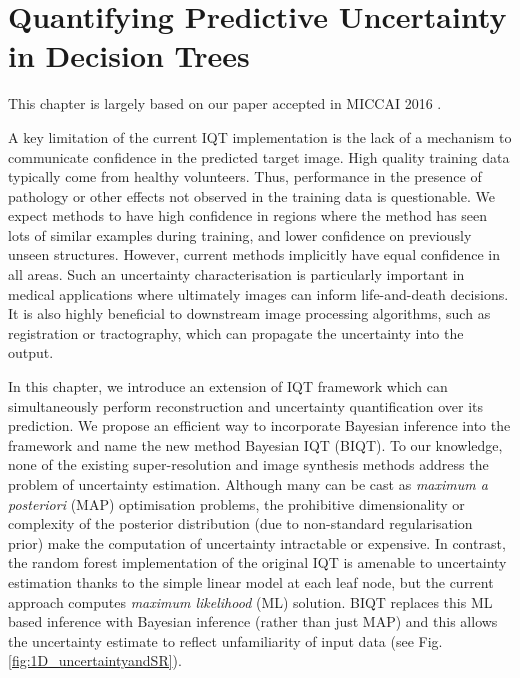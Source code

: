 \chapter{Quantifying Predictive Uncertainty in Decision Trees}
\label{chapter:biqt}
This chapter is largely based on our paper accepted in MICCAI 2016 \cite{tanno2016bayesian}.

A key limitation of the current IQT implementation is the lack of a mechanism to communicate confidence in the predicted target image. High quality training data typically come from healthy volunteers. Thus, performance in the presence of pathology or other effects not observed in the training data is questionable. We expect methods to have high confidence in regions where the method has seen lots of similar examples during training, and lower confidence on previously unseen structures. However, current methods implicitly have equal confidence in all areas. Such an uncertainty characterisation is particularly important in medical applications where ultimately images can inform life-and-death decisions. It is also highly beneficial to downstream image processing algorithms, such as registration or tractography, which can propagate the uncertainty into the output.

In this chapter, we introduce an extension of IQT framework which can simultaneously perform reconstruction and uncertainty quantification over its prediction. We propose an efficient way to incorporate Bayesian inference into the framework and name the new method Bayesian IQT (BIQT). To our knowledge, none of the existing super-resolution \cite{rousseau2008brain,coupe2013collaborative,rueda2013single,wang2014sparse} and image synthesis methods \cite{ye2013modality,jog2015mr,burgos2015robust,wein2008automatic} address the problem of uncertainty estimation. Although many can be cast as \textit{maximum a posteriori} (MAP) optimisation problems, the prohibitive dimensionality or complexity of the posterior distribution (due to non-standard regularisation prior) make the computation of uncertainty intractable or expensive. In contrast, the random forest implementation of the original IQT is amenable to uncertainty estimation thanks to the simple linear model at each leaf node, but the current approach computes \textit{maximum likelihood} (ML) solution. BIQT replaces this ML based inference with Bayesian inference (rather than just MAP) and this allows the uncertainty estimate to reflect unfamiliarity of input data (see Fig. \ref{fig:1D_uncertaintyandSR}).


